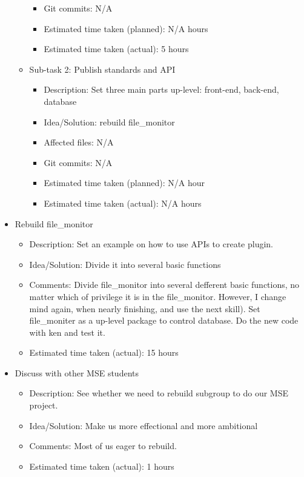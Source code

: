 \begin{itemize}
\begin{itemize}
\begin{itemize}
					\item Git commits: N/A
					\item Estimated time taken (planned): N/A hours
					\item Estimated time taken (actual): 5 hours
				 \end{itemize}
	         \item Sub-task 2: Publish standards and API
	            \begin{itemize}
				    \item Description: Set three main parts up-level: front-end, back-end, database
					\item Idea/Solution: rebuild file\_monitor 
					\item Affected files: N/A
					\item Git commits: N/A
					\item Estimated time taken (planned): N/A hour
					\item Estimated time taken (actual):  N/A hours
				 \end{itemize}
	     \end{itemize}
	\item Rebuild file\_monitor
	     \begin{itemize}
	         \item Description: Set an example on how to use APIs to create plugin. 
	         \item Idea/Solution: Divide it into several basic functions
	         \item Comments: Divide file\_monitor into several defferent basic functions, no matter which of privilege it is in the file\_monitor. However, I change mind again, when nearly finishing, and use the next skill). Set file\_moniter as a up-level package to control database. Do the new code with ken and test it.
	         \item Estimated time taken (actual): 15 hours
	     \end{itemize}
	\item Discuss with other MSE students
	     \begin{itemize}
	         \item Description: See whether we need to rebuild subgroup to do our MSE project. 
	         \item Idea/Solution: Make us more effectional and more ambitional
	         \item Comments: Most of us eager to rebuild.
	         \item Estimated time taken (actual): 1 hours
	     \end{itemize}

\end{itemize}
